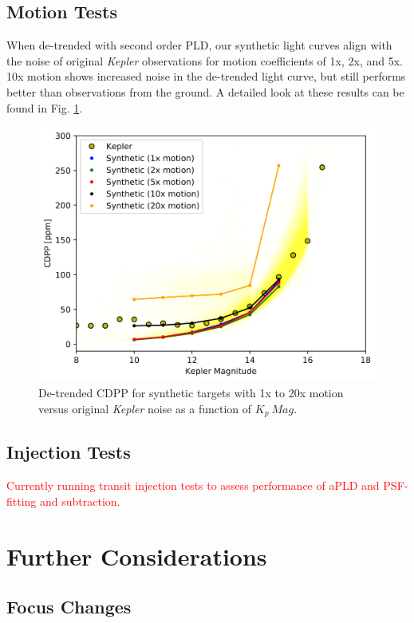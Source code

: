 \documentclass[12pt,preprint]{aastex}
\begin{document}
\subsection{Motion Tests}

When de-trended with second order PLD, our synthetic light curves align with the noise of original \textit{Kepler} observations for motion coefficients of 1x, 2x, and 5x. 10x motion shows increased noise in the de-trended light curve, but still performs better than observations from the ground. A detailed look at these results can be found in Fig. \ref{fig:detmotion}.

\begin{figure}[h]
	\centering
	\includegraphics[width=1.0\linewidth]{detmotion.png}
	\caption{De-trended CDPP for synthetic targets with 1x to 20x motion versus original \textit{Kepler} noise as a function of $K_p\ Mag$.}
	\label{fig:detmotion}
\end{figure}

\subsection{Injection Tests}

\textcolor{red}{Currently running transit injection tests to assess performance of aPLD and PSF-fitting and subtraction.}

\section{Further Considerations}

\subsection{Focus Changes}
\end{document}
